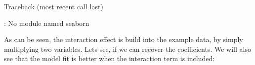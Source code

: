 \documentclass[letterpaper,10pt,english]{jupyterBook}
\begin{document}
\begin{sphinxVerbatim}[commandchars=\\\{\}]
Traceback (most recent call last)
  
    
   
   
           

: No module named \PYGZsq{}seaborn\PYGZsq{}
\end{sphinxVerbatim}

\sphinxAtStartPar
As can be seen, the interaction effect is build into the example data, by simply multiplying two variables. Lets see, if we can recover the coefficients. We will also see that the model fit is better when the interaction term is included:
\end{document}
